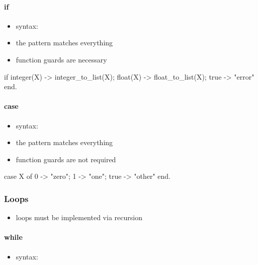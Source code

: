 \documentclass[a4paper,landscape,10pt]{article}
\begin{document}
\begin{multicols*}{2}
  \breakcolumn

  \paragraph{if}

  \begin{itemize}
    \item syntax: 
    \item the  pattern matches everything
    \item function guards are necessary
  \end{itemize}

  \begin{erlang}
if
  integer(X) -> integer_to_list(X);
  float(X) -> float_to_list(X);
  true -> "error" %
end.
\end{erlang}

  \paragraph{case}

  \begin{itemize}
    \item syntax: 
    \item the  pattern matches everything
    \item function guards are not required
  \end{itemize}

  \begin{erlang}
case X of
  0 -> "zero";
  1 -> "one";
  true -> "other"
end.
\end{erlang}

  \subsubsection{Loops}

  \begin{itemize}
    \item loops must be implemented via recursion
  \end{itemize}

  \paragraph{while}

  \begin{itemize}
    \item syntax: 
  \end{itemize}


\end{multicols*}
\end{document}
